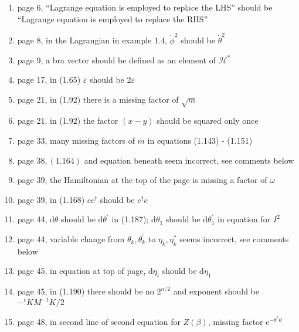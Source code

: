 \documentclass{article}
\newcommand\Dag{\textsuperscript{\dagger}}
\begin{document}
\begin{enumerate}

\item page 6\Dag, ``Lagrange equation is employed to replace the LHS'' should be ``Lagrange equation is employed to replace the RHS''
\item page 8, in the Lagrangian in example $1.4$, $\dot{\phi}^{2}$ should be $\dot{\theta}^{2}$

\item page 9, a bra vector should be defined as an element of $\mathcal{H}^{*}$

\item page 17, in (1.65) $\varepsilon$ should be $2 \varepsilon$

\item page 21, in (1.92) there is a missing factor of $\sqrt{m}$

\item page 21, in (1.92) the factor $(x-y)$ should be squared only once

\item page 33, many missing factors of $m$ in equations (1.143) - (1.151)

\item page $38,(1.164)$ and equation beneath seem incorrect, see comments below

\item page 39, the Hamiltonian at the top of the page is missing a factor of $\omega$

\item page 39, in (1.168) $c c^{\dagger}$ should be $c^{\dagger} c$

\item page 44, $\mathrm{d} \theta$ should be $\mathrm{d} \theta^{\prime}$ in (1.187); $\mathrm{d} \theta_{1}$ should be $\mathrm{d} \theta_{1}^{\prime}$ in equation for $I^{2}$

\item page 44, variable change from $\theta_{k}, \theta_{k}^{\prime}$ to $\eta_{k}, \eta_{k}^{*}$ seems incorrect, see comments below

\item page 45, in equation at top of page, $\mathrm{d} \eta_{i}$ should be $\mathrm{d} \eta_{1}$

\item page 45, in (1.190) there should be no $2^{n / 2}$ and exponent should be $-{ }^{t} K M^{-1} K / 2$

\item page 48, in second line of second equation for $Z(\beta)$, missing factor $\mathrm{e}^{-\theta^{*} \theta}$


\end{enumerate}
\end{document}
